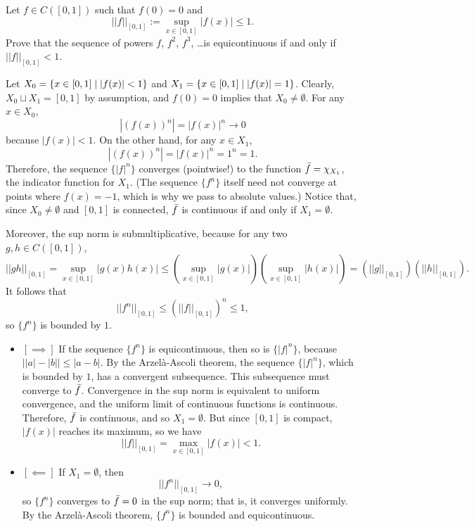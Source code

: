 \begin{problem}
Let $f \in C([0,1])$ such that $f(0) = 0$ and
$$ ||f||_{[0,1]} := \sup_{x \in [0,1]} |f(x)| \leq 1. $$
Prove that the sequence of powers $f$, $f^2$, $f^3$, \ldots is equicontinuous if and only if $||f||_{[0,1]} < 1$.
\begin{solution}
Let $X_0 = \left\{ x \in [0,1] \mid |f(x)| < 1\right\}$ and $X_1 = \left\{ x \in [0,1] \mid |f(x)| = 1\right\}$. Clearly, $X_0 \sqcup X_1 = [0,1]$ by assumption, and $f(0) = 0$ implies that $X_0 \neq \emptyset$. For any $x \in X_0$,
$$ |(f(x))^n| = |f(x)|^n \to 0 $$
because $|f(x)| < 1$. On the other hand, for any $x \in X_1$,
$$ |(f(x))^n| = |f(x)|^n = 1^n = 1. $$
Therefore, the sequence $\{|f|^n\}$ converges (pointwise!) to the function $\Bar{f} = \chi_{X_1}$, the indicator function for $X_1$. (The sequence $\{f^n\}$ itself need not converge at points where $f(x) = -1$, which is why we pass to absolute values.) Notice that, since $X_0 \neq \emptyset$ and $[0,1]$ is connected, $\Bar{f}$ is continuous if and only if $X_1 = \emptyset$.

Moreover, the sup norm is submultiplicative, because for any two $g, h \in C([0,1])$,
$$ ||gh||_{[0,1]} = \sup_{x \in [0,1]} |g(x)h(x)| \leq (\sup_{x \in [0,1]} |g(x)|) (\sup_{x \in [0,1]} |h(x)|) = (||g||_{[0,1]}) (||h||_{[0,1]}). $$
It follows that
$$ ||f^n||_{[0,1]} \leq (||f||_{[0,1]})^n \leq 1, $$
so $\{f^n\}$ is bounded by $1$.
\begin{itemize}
    \item[] $[\implies]$ If the sequence $\{f^n\}$ is equicontinuous, then so is $\{|f|^n\}$, because $\big||a|-|b|\big| \leq |a-b|$. By the Arzelà-Ascoli theorem, the sequence $\{|f|^n\}$, which is bounded by $1$, has a convergent subsequence. This subsequence must converge to $\Bar{f}$. Convergence in the sup norm is equivalent to uniform convergence, and the uniform limit of continuous functions is continuous. Therefore, $\Bar{f}$ is continuous, and so $X_1 = \emptyset$. But since $[0,1]$ is compact, $|f(x)|$ reaches its maximum, so we have
    $$ ||f||_{[0,1]} = \max_{x \in [0,1]} |f(x)| < 1. $$
    \item[] $[\impliedby]$ If $X_1 = \emptyset$, then
    $$ ||f^n||_{[0,1]} \to 0, $$
    so $\{f^n\}$ converges to $\Bar{f} = 0$ in the sup norm; that is, it converges uniformly. By the Arzelà-Ascoli theorem, $\{f^n\}$ is bounded and equicontinuous.
\end{itemize}
\end{solution}
\end{problem}

